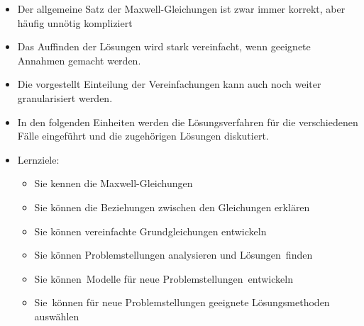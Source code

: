 \begin{frame}
  \begin{itemize}[<+->]
    \item Der allgemeine Satz der Maxwell-Gleichungen ist zwar immer
      korrekt, aber \alert{häufig unnötig kompliziert}
      \item Das Auffinden der Lösungen wird stark vereinfacht, wenn
        \alert{geeignete Annahmen} gemacht werden.
        \item Die vorgestellt Einteilung der Vereinfachungen kann auch
          noch weiter granularisiert werden.
      \item In den folgenden Einheiten werden die Lösungsverfahren für
        die verschiedenen Fälle eingeführt und die zugehörigen
        Lösungen diskutiert.
      \item \alert{Lernziele:}
        \begin{itemize}[<+->]
        \item Sie \alert{kennen} die Maxwell-Gleichungen
          \item Sie können die Beziehungen zwischen den Gleichungen
            \alert{erklären}
          \item Sie können vereinfachte Grundgleichungen \alert{entwickeln}
            \item Sie können Problemstellungen \alert{analysieren} und
              Lösungen finden
              \item Sie können Modelle für neue
                Problemstellungen \alert{entwickeln}
                \item Sie können für neue
                  Problemstellungen geeignete Lösungsmethoden \alert{auswählen}
          \end{itemize}
      \end{itemize}
  \end{frame}
 
